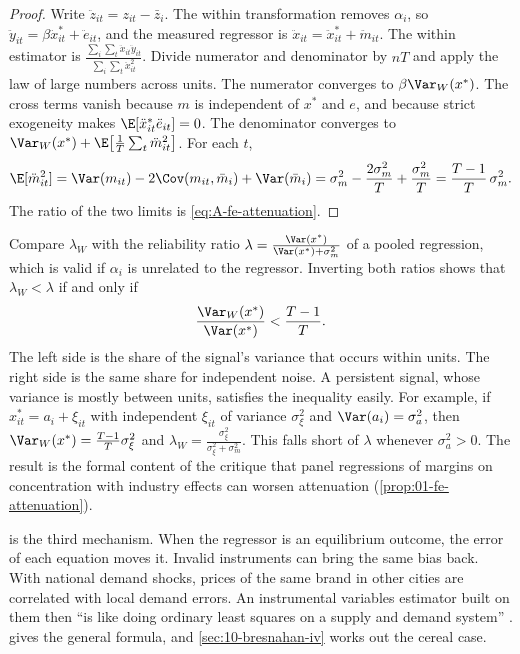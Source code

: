 \begin{proof}
Write $\ddot z_{it} = z_{it} - \bar z_i$. The within transformation removes $\alpha_i$, so
$\ddot y_{it} = \beta\ddot x_{it}^* + \ddot e_{it}$, and the measured regressor is
$\ddot x_{it} = \ddot x_{it}^* + \ddot m_{it}$. The within estimator is
$\frac{\sum_i\sum_t\ddot x_{it}\ddot y_{it}}{\sum_i\sum_t\ddot x_{it}^2}$. Divide numerator and denominator by
$nT$ and apply the law of large numbers across units. The numerator converges to
$\beta\Var_W(x^*)$. The cross terms vanish because $m$ is independent of $x^*$ and $e$, and because strict
exogeneity makes $\E[\ddot x_{it}^*\ddot e_{it}] = 0$. The denominator converges to
$\Var_W(x^*) + \E\bigl[\frac{1}{T}\sum_t\ddot m_{it}^2\bigr]$. For each $t$,
\begin{equation*}
\E[\ddot m_{it}^2] = \Var(m_{it}) - 2\Cov(m_{it}, \bar m_i) + \Var(\bar m_i)
= \sigma_m^2 - \frac{2\sigma_m^2}{T} + \frac{\sigma_m^2}{T} = \frac{T - 1}{T}\,\sigma_m^2 .
\end{equation*}
The ratio of the two limits is \eqref{eq:A-fe-attenuation}.
\end{proof}

Compare $\lambda_W$ with the reliability ratio $\lambda = \frac{\Var(x^*)}{\Var(x^*) + \sigma_m^2}$ of a pooled
regression, which is valid if $\alpha_i$ is unrelated to the regressor. Inverting both ratios shows that
$\lambda_W < \lambda$ if and only if
\begin{equation*}
\frac{\Var_W(x^*)}{\Var(x^*)} < \frac{T - 1}{T} .
\end{equation*}
The left side is the share of the signal's variance that occurs within units. The right side is the same
share for independent noise. A persistent signal, whose variance is mostly between units, satisfies the
inequality easily. For example, if $x_{it}^* = a_i + \xi_{it}$ with independent $\xi_{it}$ of variance
$\sigma_\xi^2$ and $\Var(a_i) = \sigma_a^2$, then $\Var_W(x^*) = \frac{T - 1}{T}\sigma_\xi^2$ and
$\lambda_W = \frac{\sigma_\xi^2}{\sigma_\xi^2 + \sigma_m^2}$. This falls short of $\lambda$ whenever
$\sigma_a^2 > 0$. The result is the formal content of the critique that panel regressions of margins on
concentration with industry effects \citep{Salinger1990} can worsen attenuation
(\cref{prop:01-fe-attenuation}).

 is the third mechanism. When the regressor is an equilibrium outcome, the
error of each equation moves it. Invalid instruments can bring the same bias back. With national demand
shocks, prices of the same brand in other cities are correlated with local demand errors. An instrumental
variables estimator built on them then ``is like doing ordinary least squares on a supply and demand
system'' \citep[p.~242]{Bresnahan1997}.  gives the general formula, and
\cref{sec:10-bresnahan-iv} works out the cereal case.

